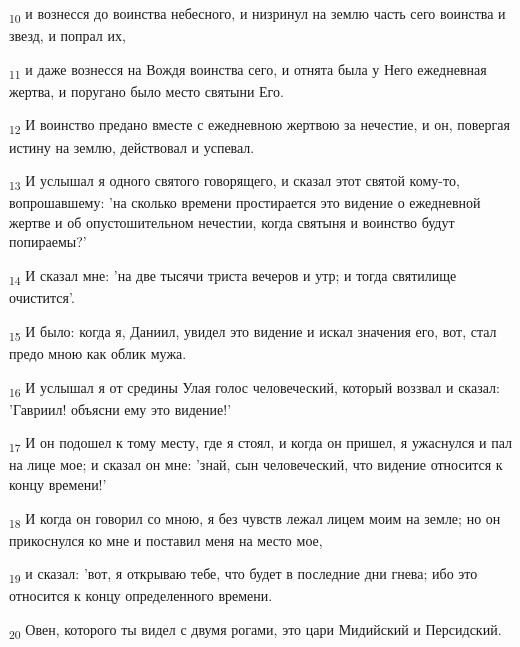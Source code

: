 \begin{tcolorbox}
\textsubscript{10} и вознесся до воинства небесного, и низринул на землю часть сего воинства и звезд, и попрал их,
\end{tcolorbox}
\begin{tcolorbox}
\textsubscript{11} и даже вознесся на Вождя воинства сего, и отнята была у Него ежедневная жертва, и поругано было место святыни Его.
\end{tcolorbox}
\begin{tcolorbox}
\textsubscript{12} И воинство предано вместе с ежедневною жертвою за нечестие, и он, повергая истину на землю, действовал и успевал.
\end{tcolorbox}
\begin{tcolorbox}
\textsubscript{13} И услышал я одного святого говорящего, и сказал этот святой кому-то, вопрошавшему: 'на сколько времени простирается это видение о ежедневной жертве и об опустошительном нечестии, когда святыня и воинство будут попираемы?'
\end{tcolorbox}
\begin{tcolorbox}
\textsubscript{14} И сказал мне: 'на две тысячи триста вечеров и утр; и тогда святилище очистится'.
\end{tcolorbox}
\begin{tcolorbox}
\textsubscript{15} И было: когда я, Даниил, увидел это видение и искал значения его, вот, стал предо мною как облик мужа.
\end{tcolorbox}
\begin{tcolorbox}
\textsubscript{16} И услышал я от средины Улая голос человеческий, который воззвал и сказал: 'Гавриил! объясни ему это видение!'
\end{tcolorbox}
\begin{tcolorbox}
\textsubscript{17} И он подошел к тому месту, где я стоял, и когда он пришел, я ужаснулся и пал на лице мое; и сказал он мне: 'знай, сын человеческий, что видение относится к концу времени!'
\end{tcolorbox}
\begin{tcolorbox}
\textsubscript{18} И когда он говорил со мною, я без чувств лежал лицем моим на земле; но он прикоснулся ко мне и поставил меня на место мое,
\end{tcolorbox}
\begin{tcolorbox}
\textsubscript{19} и сказал: 'вот, я открываю тебе, что будет в последние дни гнева; ибо это относится к концу определенного времени.
\end{tcolorbox}
\begin{tcolorbox}
\textsubscript{20} Овен, которого ты видел с двумя рогами, это цари Мидийский и Персидский.
\end{tcolorbox}
